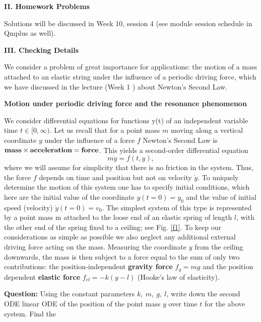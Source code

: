 \documentclass[11pt,a4paper,twoside]{article}
\begin{document}
	\textbf{II. Homework Problems}\par
	Solutions will be discussed in Week 10, session 4 (see module session schedule in Qmplus as well).\par
	\textbf{III. Checking Details}\par
	We consider a problem of great importance for applications: the motion of a mass attached to an elastic string under the influence of a periodic driving force, which we have discussed in the lecture (Week 1 ) about Newton’s Second Law.\par
	\textbf{Motion under periodic driving force and the resonance phenomenon}\par
	We consider differential equations for functions y(t) of an independent variable time $t \in [0,\infty)$. Let us recall that for a point mass $m$ moving along a vertical coordinate $y$ under the influence of a force $f$ Newton’s Second Law is $\text{\textbf{mass}} \times \text{\textbf{acceleration}} = \text{\textbf{force}}$. This yields a second-order differential equation
	$$
	m\ddot{y} = f(t,y),
	$$
	where we will assume for simplicity that there is no friction in the system. Thus, the force $f$ depends on time and position but not on velocity $\dot{y}$. To uniquely determine the motion of this system one has to specify initial conditions, which here are the initial value of the coordinate $y(t = 0) = y_0$ and the value of initial speed (velocity) $\dot{y}(t = 0) = v_0$. The simplest system of this type is represented by a point mass m attached to the loose end of an elastic spring of length $l$, with the other end of the spring fixed to a ceiling; see Fig. \ref{f1}. To keep our considerations as simple as possible we also neglect any additional external driving force acting on the mass. Measuring the coordinate $y$ from the ceiling downwards, the mass is then subject to a force equal to the sum of only two contributions: the position-independent \textbf{gravity force} $f_g = mg$ and the position dependent \textbf{elastic force} $f_{el} = -k(y − l)$ (Hooke’s law of elasticity).\par
	\textbf{Question:} Using the constant parameters $k,\ m,\ g,\ l$, write down the second ODE linear ODE of the position of the point mass $y$ over time $t$ for the above system. Find the
\end{document}
